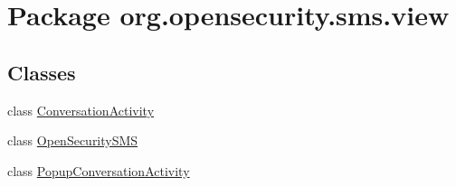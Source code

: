 \hypertarget{a00040}{\section{Package org.\+opensecurity.\+sms.\+view}
\label{a00040}
}
\subsection*{Classes}
\begin{DoxyCompactItemize}
\item 
class \hyperlink{a00007}{Conversation\+Activity}
\item 
class \hyperlink{a00010}{Open\+Security\+S\+M\+S}
\item 
class \hyperlink{a00012}{Popup\+Conversation\+Activity}
\end{DoxyCompactItemize}

